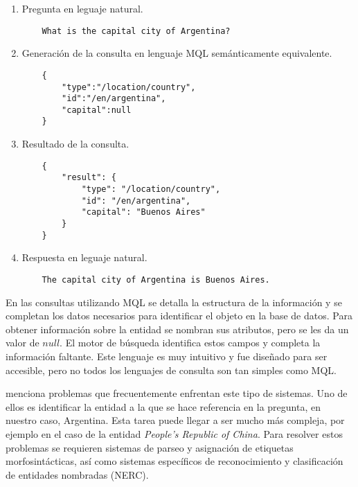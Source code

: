 \begin{example}\label{QALD-etapas}\hfill
    \begin{enumerate}
        \item Pregunta en leguaje natural.
            \begin{lstlisting}
    What is the capital city of Argentina?
            \end{lstlisting}
        \item Generación de la consulta en lenguaje MQL semánticamente equivalente.
            \begin{lstlisting}
    {
        "type":"/location/country",
        "id":"/en/argentina",
        "capital":null
    }
            \end{lstlisting}
        \item Resultado de la consulta.
            \begin{lstlisting}
    {
        "result": {
            "type": "/location/country",
            "id": "/en/argentina",
            "capital": "Buenos Aires"
        }
    }
            \end{lstlisting}
        \item Respuesta en leguaje natural.
            \begin{lstlisting}
    The capital city of Argentina is Buenos Aires.
            \end{lstlisting}
    \end{enumerate}
\end{example}

En las consultas utilizando MQL se detalla la estructura de la información y se completan los datos necesarios para identificar el objeto en la base de datos. Para obtener información sobre la entidad se nombran sus atributos, pero se les da un valor de $null$. El motor de búsqueda identifica estos campos y completa la información faltante. Este lenguaje es muy intuitivo y fue diseñado para ser accesible, pero no todos los lenguajes de consulta son tan simples como MQL.

\citet{ungerQALD} menciona problemas que frecuentemente enfrentan este tipo de sistemas. Uno de ellos es identificar la entidad a la que se hace referencia en la pregunta, en nuestro caso, Argentina. Esta tarea puede llegar a ser mucho más compleja, por ejemplo en el caso de la entidad \textit{People's Republic of China}. Para resolver estos problemas se requieren sistemas de parseo y asignación de etiquetas morfosintácticas, así como sistemas específicos de reconocimiento y clasificación de entidades nombradas (NERC).

